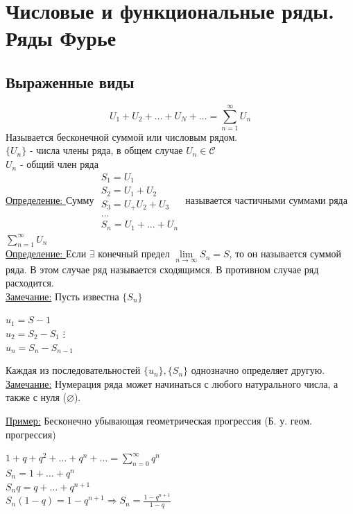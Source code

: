 \documentclass[12pt]{article}
\let\oldsum\sum
\let\oldlim\lim
\renewcommand{\sum}{\oldsum\limits}
\renewcommand{\lim}{\oldlim\limits}
\begin{document}
  \section{Числовые и функциональные ряды. Ряды Фурье}
  \subsection{Выраженные виды}
  \[  U_1+U_2+\dots+U_N+\dots=\sum_{n=1}^{\infty} U_n\]
  Называется бесконечной суммой или числовым рядом.\\
  $\{ U_n\}$ - числа члены ряда, в общем случае $U_n \in \mathcal{C}$\\
  $U_n$ - общий член ряда\\
  \underline{Определение: } Сумму $\begin{matrix}
    S_1=U_1\\
    S_2=U_1+U_2\\
    S_3=U_+U_2+U_3\\
    \dots\\
    S_n=U_1+\dots+U_n
  \end{matrix}$
  называется частичными суммами ряда $\sum_{n=1}^{\infty} U_n$\\
  
  \underline{Определение: } Если $\exists$ конечный предел $\lim_{n \to \infty} S_n =S$, то он называется
  суммой ряда. В этом случае ряд называется сходящимся. В противном случае ряд расходится.\\

  \underline{Замечание:} Пусть известна $\{S_n\}$
  \begin{center}
    $u_1=S-1$\\
    $u_2=S_2-S_1$
    $\vdots$\\
    $u_n=S_n-S_{n-1}$
  \end{center}
  Каждая из последовательностей $\{u_n\},\{S_n\}$ однозначно определяет другую.\\

  \underline{Замечание:} Нумерация ряда может начинаться с любого натурального числа, а также с нуля ($\varnothing$).

  \underline{Пример:} Бесконечно убывающая геометрическая прогрессия (Б. у. геом. прогрессия)
  \begin{center}
    $1+q+q^2+\dots+q^n+\dots=\sum^{\infty}_{n=0} q^n$\\
    $S_n=1+\dots+q^n$\\
    $S_n q=q+\dots+q^{n+1}$\\
    $S_n(1-q)=1-q^{n+1}\Rightarrow S_n = \frac{1-q^{n+1}}{1-q}$
  \end{center}
\end{document}
